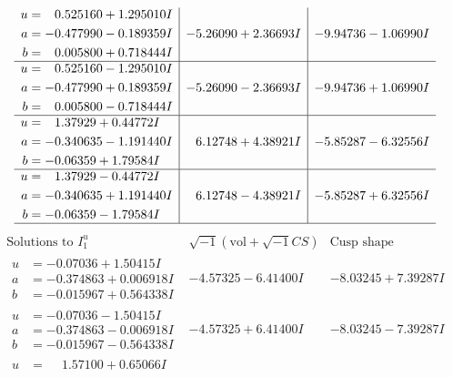 \documentclass[1p]{elsarticle_modified}
\theoremstyle{definition}
\newcommand{\I}{\sqrt{-1}}
\begin{document}
$$\begin{array}{c|c|c}
\begin{aligned}
u &= \phantom{-}0.525160 + 1.295010 I \\
a &= -0.477990 - 0.189359 I \\
b &= \phantom{-}0.005800 + 0.718444 I\end{aligned}
 & -5.26090 + 2.36693 I & -9.94736 - 1.06990 I \\ \hline\begin{aligned}
u &= \phantom{-}0.525160 - 1.295010 I \\
a &= -0.477990 + 0.189359 I \\
b &= \phantom{-}0.005800 - 0.718444 I\end{aligned}
 & -5.26090 - 2.36693 I & -9.94736 + 1.06990 I \\ \hline\begin{aligned}
u &= \phantom{-}1.37929 + 0.44772 I \\
a &= -0.340635 - 1.191440 I \\
b &= -0.06359 + 1.79584 I\end{aligned}
 & \phantom{-}6.12748 + 4.38921 I & -5.85287 - 6.32556 I \\ \hline\begin{aligned}
u &= \phantom{-}1.37929 - 0.44772 I \\
a &= -0.340635 + 1.191440 I \\
b &= -0.06359 - 1.79584 I\end{aligned}
 & \phantom{-}6.12748 - 4.38921 I & -5.85287 + 6.32556 I\\
 \hline 
 \end{array}$$\newpage$$\begin{array}{c|c|c}  
\text{Solutions to }I^u_{1}& \I (\text{vol} + \sqrt{-1}CS) & \text{Cusp shape}\\
 \hline 
\begin{aligned}
u &= -0.07036 + 1.50415 I \\
a &= -0.374863 + 0.006918 I \\
b &= -0.015967 + 0.564338 I\end{aligned}
 & -4.57325 - 6.41400 I & -8.03245 + 7.39287 I \\ \hline\begin{aligned}
u &= -0.07036 - 1.50415 I \\
a &= -0.374863 - 0.006918 I \\
b &= -0.015967 - 0.564338 I\end{aligned}
 & -4.57325 + 6.41400 I & -8.03245 - 7.39287 I \\ \hline\begin{aligned}
u &= \phantom{-}1.57100 + 0.65066 I \\

\end{aligned}
\end{array}$$
\end{document}

